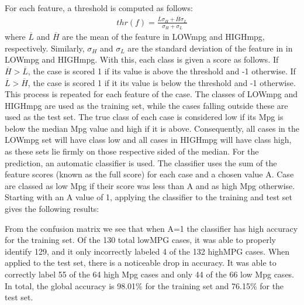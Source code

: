 \documentclass{homework}
\begin{document}
\question
For each feature, a threshold is computed as follows:
\begin{eqnarray}
thr(f)=\frac{\overline{L}\sigma_H+\overline{H}\sigma_L}{\sigma_H+\sigma_L}
\end{eqnarray}
where $\overline{L}$ and $\overline{H}$ are the mean of the feature in LOWmpg and HIGHmpg, respectively. Similarly, $\sigma_H$ and $\sigma_L$ are the standard deviation of the feature in in LOWmpg and HIGHmpg. With this, each class is given a score as follows. If $\overline{H}>\overline{L}$, the case is scored 1 if its value is above the threshold and -1 otherwise. If $\overline{L}>\overline{H}$, the case is scored 1 if it its value is below the threshold and -1 otherwise. This process is repeated for each feature of the case.
\question
The classes of LOWmpg and HIGHmpg are used as the training set, while the cases falling outside these are used as the test set. The true class of each case is considered low if its Mpg is below the median Mpg value and high if it is above. Consequently, all cases in the LOWmpg set will have class low and all cases in HIGHmpg will have class high, as these sets lie firmly on those respective sided of the median. For the prediction, an automatic classifier is used. The classifier uses the sum of the feature scores (known as the full score) for each case and a chosen value A. Case are classed as low Mpg if their score was less than A and as high Mpg otherwise. 
\\
Starting with an A value of 1, applying the classifier to the training and test set gives the following results:
\begin{table}[H]
    \centering
    \caption{Confusion Matrix. True class is by row, Predicted class is by column}
    \label{tab:my_label}
\end{table}

From the confusion matrix we see that when A=1 the classifier has high accuracy for the training set. Of the 130 total lowMPG cases, it was able to properly identify 129, and it only incorrectly labeled 4 of the 132 highMPG cases. When applied to the test set, there is a noticeable drop in accuracy. It was able to correctly label 55 of the 64 high Mpg cases and only 44 of the 66 low Mpg cases. In total, the global accuracy is 98.01\% for the training set and 76.15\% for the test set.
\end{document}
